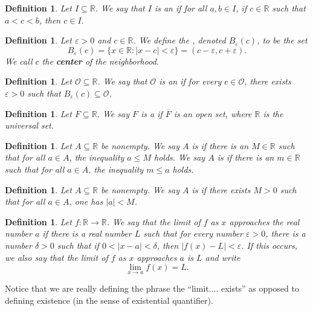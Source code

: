 \documentclass{book}
\newcounter{ekcounter}%
\theoremstyle{ekimcustom}
\newtheorem{definition}[ekcounter]{Definition}
\newcommand\defn[1]{{\color{blue}{\bf #1}}}
\begin{document}
\begin{definition}
Let $I \subseteq \mathbb{R}$.  We say that $I$ is an \defn{interval} if for all $a,b \in I$, if $c \in \mathbb{R}$ such that $a < c < b$, then $c \in I$.
\end{definition}

\begin{definition}
Let $\varepsilon > 0$ and $c \in \mathbb{R}$.  We define the \defn{$\varepsilon$-neighborhood about $c$}, denoted $B_{\varepsilon}(c)$, to be the set $$B_{\varepsilon}(c) = \{x \in \mathbb{R} : |x-c| < \varepsilon\} = (c-\varepsilon,c+\varepsilon).$$  We call $c$ the \textbf{center} of the neighborhood.
\end{definition}

\begin{definition}
Let $\mathcal{O} \subseteq \mathbb{R}$.  We say that $\mathcal{O}$ is an \defn{open set} if for every $c \in \mathcal{O}$, there exists $\varepsilon > 0$ such that $B_{\varepsilon}(c) \subseteq \mathcal{O}$.
\end{definition}

\begin{definition}
Let $F \subseteq \mathbb{R}$.  We say $F$ is a \defn{closed set} if $\overline{F}$ is an open set, where $\mathbb{R}$ is the universal set.
\end{definition}

\begin{definition}
Let $A \subseteq \mathbb{R}$ be nonempty.
We say $A$ is \defn{bounded above} if there is an $M \in \mathbb{R}$ such that for all $a \in A$, the inequality $a \leq M$ holds.
We say $A$ is \defn{bounded below} if there is an $m \in \mathbb{R}$ such that for all $a \in A$, the inequality $m \leq a$ holds.
\end{definition}

\begin{definition}
Let $A \subseteq \mathbb{R}$ be nonempty.  We say $A$ is \defn{bounded} if there exists $M > 0$ such that for all $a \in A$, one has $|a| < M$.
\end{definition}

\begin{definition}
Let $f : \mathbb{R} \to \mathbb{R}$. We say that the limit of $f$ as $x$ approaches the real number $a$ \defn{exists} if there is a real number $L$ such that for every number $\varepsilon > 0 $, there is a number $\delta > 0$ such that if $0 < |x-a| < \delta$, then $|f(x) - L| < \varepsilon$. If this occurs, we also say that the limit of $f$ as $x$ approaches $a$ is $L$ and write
\[ \lim_{x \to a} f(x) = L.\]
\end{definition}
Notice that we are really defining the phrase the ``limit.... exists'' as opposed to defining existence (in the sense of existential quantifier).
\end{document}
